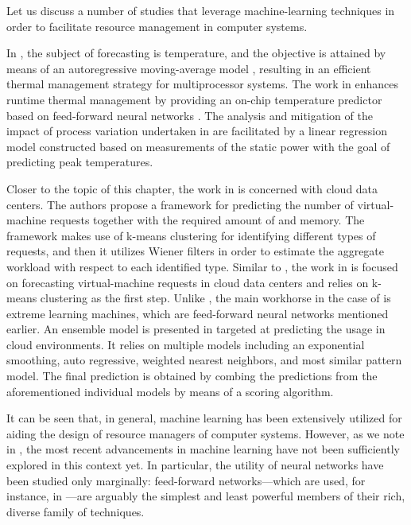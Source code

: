 Let us discuss a number of studies that leverage machine-learning techniques in
order to facilitate resource management in computer systems.

In \cite{coskun2008}, the subject of forecasting is temperature, and the
objective is attained by means of an autoregressive moving-average model
\cite{hastie2013}, resulting in an efficient thermal management strategy for
multiprocessor systems. The work in \cite{kumar2010} enhances runtime thermal
management by providing an on-chip temperature predictor based on feed-forward
neural networks \cite{hastie2013}. The analysis and mitigation of the impact of
process variation undertaken in \cite{juan2014} are facilitated by a linear
regression model \cite{hastie2013} constructed based on measurements of the
static power with the goal of predicting peak temperatures.

Closer to the topic of this chapter, the work in \cite{dabbagh2015} is concerned
with cloud data centers. The authors propose a framework for predicting the
number of virtual-machine requests together with the required amount of 
and memory. The framework makes use of k-means clustering \cite{hastie2013} for
identifying different types of requests, and then it utilizes Wiener filters in
order to estimate the aggregate workload with respect to each identified type.
Similar to \cite{dabbagh2015}, the work in \cite{ismaeel2015} is focused on
forecasting virtual-machine requests in cloud data centers and relies on k-means
clustering as the first step. Unlike \cite{dabbagh2015}, the main workhorse in
the case of \cite{ismaeel2015} is extreme learning machines, which are
feed-forward neural networks mentioned earlier. An ensemble model
\cite{hastie2013} is presented in \cite{cao2014} targeted at predicting the
 usage in cloud environments. It relies on multiple models including an
exponential smoothing, auto regressive, weighted nearest neighbors, and most
similar pattern model. The final prediction is obtained by combing the
predictions from the aforementioned individual models by means of a scoring
algorithm.

It can be seen that, in general, machine learning has been extensively utilized
for aiding the design of resource managers of computer systems. However, as we
note in , the most recent advancements in machine
learning have not been sufficiently explored in this context yet. In particular,
the utility of neural networks have been studied only marginally: feed-forward
networks---which are used, for instance, in \cite{kumar2010, ismaeel2015}---are
arguably the simplest and least powerful members of their rich, diverse family
of techniques.

